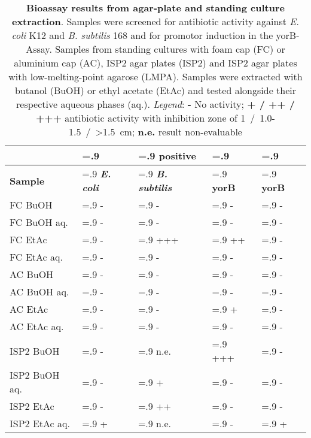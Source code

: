     \begin{table}[htbp]
        \caption[Bioassay results from agar-plate and standing culture extraction]{%
        	\textbf{Bioassay results from agar-plate and standing culture extraction}.
	        Samples were screened for antibiotic activity against \textit{E. coli} K12 and \textit{B. subtilis} 168 and for promotor induction in the yorB-Assay.
	        Samples from standing cultures with foam cap (FC) or aluminium cap (AC), ISP2 agar plates (ISP2) and ISP2 agar plates with low-melting-point agarose (LMPA).
	        Samples were extracted with butanol (BuOH) or ethyl acetate (EtAc) and tested alongside their respective aqueous phases (aq.).
	        \emph{Legend}: \textbf{-} No activity; \textbf{+ / ++ / +++} antibiotic activity with inhibition zone of 1~/~1.0-1.5~/~>1.5~cm; \textbf{n.e.} result non-evaluable}
        \label{tab:yorB_assay_results}
        \centering
        \begin{tabularx}{\textwidth}{>{\hsize=1.4\hsize}X>{\hsize=.9\hsize}X>{\hsize=.9\hsize}X>{\hsize=.9\hsize}X>{\hsize=.9\hsize}X}
            \toprule
            & \multicolumn{3}{c}{Antibacterial} & positive \\
            \cline{2-4}
            \textbf{Sample} & \textbf{\textit{E. coli}}     & \textbf{\textit{B. subtilis}}  & \textbf{yorB}  & \textbf{yorB}    \\
            \midrule
            FC BuOH         & -     & -     & -     & -    \\
            FC BuOH aq.     & -     & -     & -     & -    \\
            FC EtAc         & -     & +++   & ++    & -    \\
            FC EtAc aq.     & -     & -     & -     & -    \\
            AC BuOH         & -     & -     & -     & -    \\
            AC BuOH aq.     & -     & -     & -     & -    \\
            AC EtAc         & -     & -     & +     & -    \\
            AC EtAc aq.     & -     & -     & -     & -    \\
            \midrule
            ISP2 BuOH       & -     & n.e.  & +++   & -    \\
            ISP2 BuOH aq.   & -     & +     & -     & -    \\
            ISP2 EtAc       & -     & ++    & -     & -    \\
            ISP2 EtAc aq.   & +     & n.e.  & -     & +    \\

\end{tabularx}
\end{table}
